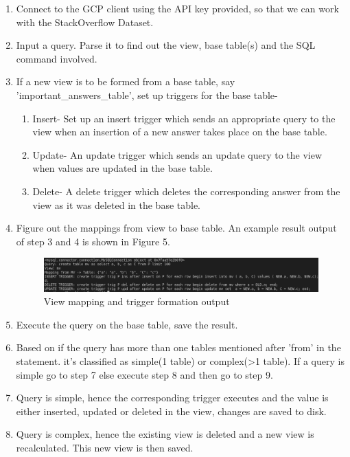 \documentclass[12pt]{report}
\begin{document}
\begin{enumerate}
	\item Connect to the GCP client using the API key provided, so that we can work with the StackOverflow Dataset.
	\item Input a query. Parse it to find out the view, base table(s) and the SQL command involved.
	\item If a new view is to be formed from a base table, say 'important\_answers\_table', set up triggers for the base table- 
		\begin{enumerate}
			\item Insert- Set up an insert trigger which sends an appropriate query to the view when an insertion of a new answer takes place on the base table.
			\item Update- An update trigger which sends an update query to the view when values are updated in the base table.
			\item Delete- A delete trigger which deletes the corresponding answer from the view as it was deleted in the base table.
		\end{enumerate}
	\item Figure out the mappings from view to base table. An example result output of step 3 and 4 is shown in Figure 5.
		\begin{figure}[H]
		\centering \includegraphics[width=1\textwidth]{images/mvq.png}
		\caption{View mapping and trigger formation output}
		\end{figure}
	\item Execute the query on the base table, save the result.
	\item Based on if the query has more than one tables mentioned after 'from' in the statement. it's classified as simple(1 table) or complex(>1 table). If a query is 					simple go to step 7 else execute step 8 and then go to step 9.
	\item Query is simple, hence the corresponding trigger executes and the value is either inserted, updated or deleted in the view, changes are saved to disk.
	\item Query is complex, hence the existing view is deleted and a new view is recalculated. This new view is then saved.
\end{enumerate}
\end{document}
